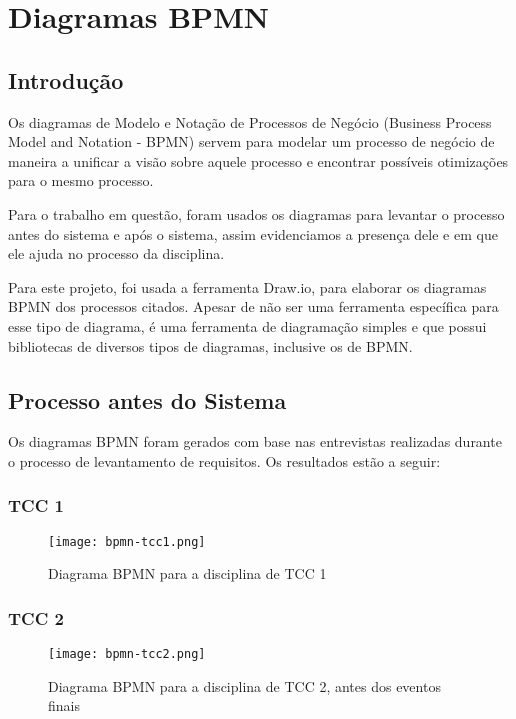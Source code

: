 \chapter{Diagramas BPMN}\label{chap:bpmn-appendix}

\section{Introdução}

Os diagramas de Modelo e Notação de Processos de Negócio (Business Process Model and Notation - BPMN) servem para modelar um processo de negócio de maneira a unificar a visão sobre aquele processo e encontrar possíveis otimizações para o mesmo processo.

Para o trabalho em questão, foram usados os diagramas para levantar o processo antes do sistema e após o sistema, assim evidenciamos a presença dele e em que ele ajuda no processo da disciplina.

Para este projeto, foi usada a ferramenta Draw.io\cite{drawio}, para elaborar os diagramas BPMN dos processos citados. Apesar de não ser uma ferramenta específica para esse tipo de diagrama, é uma ferramenta de diagramação simples e que possui bibliotecas de diversos tipos de diagramas, inclusive os de BPMN.

\section{Processo antes do Sistema}

Os diagramas BPMN foram gerados com base nas entrevistas realizadas durante o processo de levantamento de requisitos. Os resultados estão a seguir:

\subsection{TCC 1}
\begin{figure}[H]
    \centering
    \texttt{[image: bpmn-tcc1.png]}
    \caption{Diagrama BPMN para a disciplina de TCC 1}
    \label{fig:bpmn-tcc1}
\end{figure}

\subsection{TCC 2}
\begin{figure}[H]
    \centering
    \texttt{[image: bpmn-tcc2.png]}
    \caption{Diagrama BPMN para a disciplina de TCC 2, antes dos eventos finais}
    \label{fig:bpmn-tcc2}
\end{figure}

